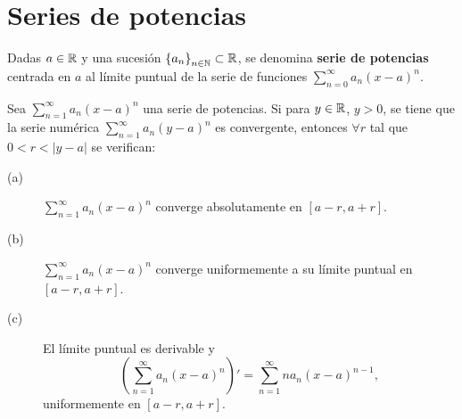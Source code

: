 \section{Series de potencias}
\begin{fdefinition}
	\normalfont Dadas $\displaystyle a \in \mathbb{R} $ y una sucesión $\displaystyle \left\{ a_{n}\right\} _{n\in\mathbb{N}}\subset \mathbb{R} $, se denomina \textbf{serie de potencias} centrada en $\displaystyle a $ al límite puntual de la serie de funciones $\displaystyle \sum^{\infty}_{n = 0}a_{n}\left(x-a\right)^{n} $.
\end{fdefinition}
\begin{ftheorem}[]
\normalfont Sea $\displaystyle \sum^{\infty}_{n = 1}a_{n}\left(x-a\right)^{n} $ una serie de potencias. Si para $\displaystyle y \in \mathbb{R} $, $\displaystyle y > 0 $, se tiene que la serie numérica $\displaystyle \sum^{\infty}_{n = 1}a_{n}\left(y-a\right)^{n} $ es convergente, entonces $\displaystyle \forall r  $ tal que $\displaystyle 0<r< \left|y - a\right| $ se verifican:
\begin{description}
	\item[(a)] $\displaystyle \sum^{\infty}_{n = 1}a_{n}\left(x-a\right)^{n} $ converge absolutamente en $\displaystyle \left[a-r, a+r\right]  $.
	\item[(b)] $\displaystyle \sum^{\infty}_{n = 1}a_{n}\left(x-a\right)^{n} $ converge uniformemente a su límite puntual en $\displaystyle \left[a-r, a + r\right]  $.
	\item[(c)] El límite puntual es derivable y 
		\[ \left(\sum^{\infty}_{n = 1}a_{n}\left(x-a\right)^{n}\right)' = \sum^{\infty}_{n = 1}na_{n}\left(x-a\right)^{n-1},\]
		uniformemente en $\displaystyle \left[a-r,a +r\right]  $.
\end{description}
\end{ftheorem}
